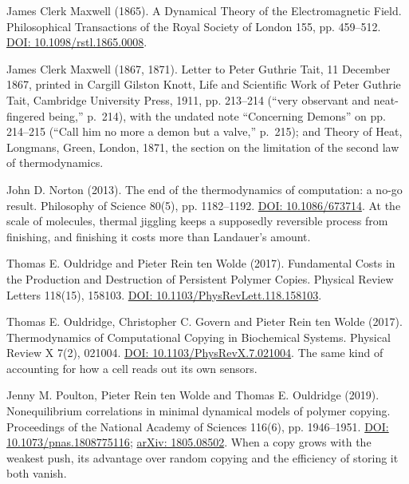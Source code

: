 \noindent James Clerk Maxwell (1865). A Dynamical Theory of the Electromagnetic Field. Philosophical Transactions of the Royal Society of London 155, pp. 459--512. \href{https://doi.org/10.1098/rstl.1865.0008}{DOI: 10.1098/rstl.1865.0008}.
\par\medskip

\noindent James Clerk Maxwell (1867, 1871). Letter to Peter Guthrie Tait, 11 December 1867, printed in Cargill Gilston Knott, Life and Scientific Work of Peter Guthrie Tait, Cambridge University Press, 1911, pp. 213--214 (``very observant and neat-fingered being,'' p.~214), with the undated note ``Concerning Demons'' on pp. 214--215 (``Call him no more a demon but a valve,'' p.~215); and Theory of Heat, Longmans, Green, London, 1871, the section on the limitation of the second law of thermodynamics.
\par\medskip

\noindent John D. Norton (2013). The end of the thermodynamics of computation: a no-go result. Philosophy of Science 80(5), pp. 1182--1192. \href{https://doi.org/10.1086/673714}{DOI: 10.1086/673714}. At the scale of molecules, thermal jiggling keeps a supposedly reversible process from finishing, and finishing it costs more than Landauer's amount.
\par\medskip

\noindent Thomas E. Ouldridge and Pieter Rein ten Wolde (2017). Fundamental Costs in the Production and Destruction of Persistent Polymer Copies. Physical Review Letters 118(15), 158103. \href{https://doi.org/10.1103/PhysRevLett.118.158103}{DOI: 10.1103/PhysRevLett.118.158103}.
\par\medskip

\noindent Thomas E. Ouldridge, Christopher C. Govern and Pieter Rein ten Wolde (2017). Thermodynamics of Computational Copying in Biochemical Systems. Physical Review X 7(2), 021004. \href{https://doi.org/10.1103/PhysRevX.7.021004}{DOI: 10.1103/PhysRevX.7.021004}. The same kind of accounting for how a cell reads out its own sensors.
\par\medskip

\noindent Jenny M. Poulton, Pieter Rein ten Wolde and Thomas E. Ouldridge (2019). Nonequilibrium correlations in minimal dynamical models of polymer copying. Proceedings of the National Academy of Sciences 116(6), pp. 1946--1951. \href{https://doi.org/10.1073/pnas.1808775116}{DOI: 10.1073/pnas.1808775116}; \href{https://arxiv.org/abs/1805.08502}{arXiv: 1805.08502}. When a copy grows with the weakest push, its advantage over random copying and the efficiency of storing it both vanish.
\par\medskip

